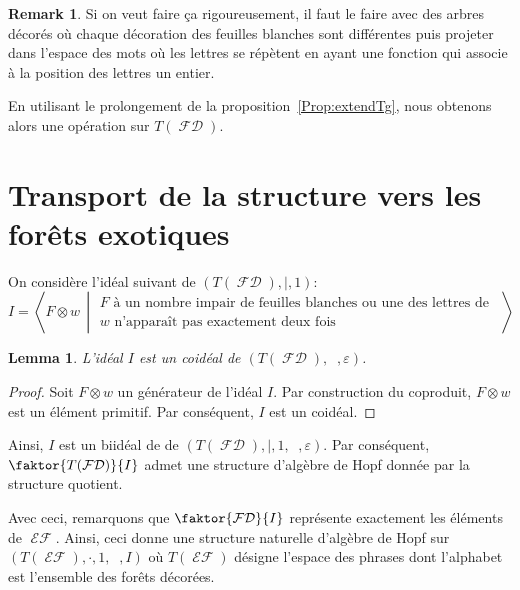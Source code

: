 \documentclass[french]{article}
\theoremstyle{definition}
\newtheorem{Rq}{\textbf{Remark}}[section]
\theoremstyle{plain}
\newtheorem{Lemme}[defi]{Lemma}
\newcommand{\e}{\varepsilon}
\DeclareMathOperator{\Dsh}{{\Delta_{\shuffle}}}
\DeclareMathOperator{\EF}{\mathcal{EF}}
\DeclareMathOperator{\FD}{\mathcal{FD}}
\begin{document}
\begin{Rq}
	Si on veut faire ça rigoureusement, il faut le faire avec des arbres décorés où chaque décoration des feuilles blanches sont différentes puis projeter dans l'espace des mots où les lettres se répètent en ayant une fonction qui associe à la position des lettres un entier.
\end{Rq}

En utilisant le prolongement de la proposition~\ref{Prop:extendTg}, nous obtenons alors une opération \PH{} sur $T(\FD)$.

\section{Transport de la structure vers les forêts exotiques}

On considère l'idéal suivant de $(T(\FD),|,1)$:
\[
I=\left\langle F\otimes w \,\middle| \begin{array}{c}
	F \text{ à un nombre impair de feuilles blanches ou une des lettres de } \\
	 w \text{ n'apparaît pas exactement deux fois }
\end{array}\,  \right\rangle
\]
\begin{Lemme}
	L'idéal $I$ est un coidéal de $(T(\FD), \Dsh, \e)$.
\end{Lemme}
\begin{proof}
	Soit $F\otimes w$ un générateur de l'idéal $I$. Par construction du coproduit, $F\otimes w$ est un élément primitif. Par conséquent, $I$ est un coidéal.
\end{proof}

Ainsi, $I$ est un biidéal de de $(T(\FD), |, 1, \Dsh, \e)$. Par conséquent, $\faktor{T(\FD)}{I}$ admet une structure d'algèbre de Hopf donnée par la structure quotient. 

%

Avec ceci, remarquons que $\faktor{\FD}{I}$ représente exactement les éléments de $\EF$. Ainsi, ceci donne une structure naturelle d'algèbre de Hopf sur $(T(\EF),\cdot,1,\Dsh,I)$ où $T(\EF)$ désigne l'espace des phrases dont l'alphabet est l'ensemble des forêts décorées.
\end{document}
